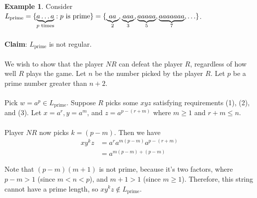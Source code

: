 \documentclass[]{article}
\DeclarePairedDelimiter{\set}{\lbrace}{\rbrace}
\theoremstyle{definition}
\newtheorem{ex}{Example}[section]
\begin{document}
        \begin{ex}
          Consider $L_\text{prime} = \set{\underbrace{a \ldots a}_{p \text{ times}} : p \text{ is prime}} = \set{ \underbrace{aa}_{2}, \underbrace{aaa}_3, \underbrace{aaaaa}_5, \underbrace{aaaaaaa}_7, \ldots}$.
          \\ \\
          \textbf{Claim}: $L_\text{prime}$ is not regular.
          \\ \\
          We wish to show that the player $NR$ can defeat the player $R$, regardless of how well $R$ plays the game. Let $n$ be the number picked by the player $R$. Let $p$ be a prime number greater than $n + 2$.
          \\ \\
          Pick $w = a^p \in L_\text{prime}$. Suppose $R$ picks some $xyz$ satisfying requirements (1), (2), and (3). Let $x = a^r, y = a^m$, and $z = a^{p - (r + m)}$ where $m \ge 1$ and $r + m \le n$.
          \\ \\
          Player $NR$ now picks $k = (p - m)$. Then we have
          \begin{align*}
            xy^k z &= a^r a^{m(p-m)} a^{p-(r + m)} \\
            &= a^{m(p-m) + (p-m)}
          \end{align*}

          Note that $(p - m)(m + 1)$ is not prime, because it's two factors, where $p - m > 1$ (since $m < n < p$), and $m + 1 > 1$ (since $m \ge 1$). Therefore, this string cannot have a prime length, so $xy^k z \not \in L_\text{prime}$.
        \end{ex}
\end{document}
